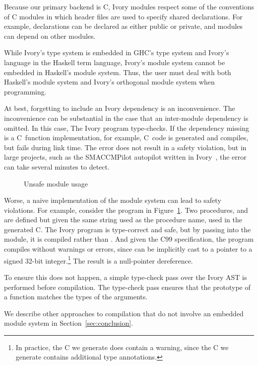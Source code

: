 Because our primary backend is C, Ivory modules respect some of the conventions
of C modules in which header files are used to specify shared declarations. For
example, declarations can be declared as either public or private, and modules
can depend on other modules.

While Ivory's type system is embedded in GHC's type system and Ivory's language
in the Haskell term language, Ivory's module system cannot be embedded in
Haskell's module system. Thus, the user must deal with both Haskell's module
system and Ivory's orthogonal module system when programming.

At best, forgetting to include an Ivory dependency is an inconvenience. The
inconvenience can be substantial in the case that an inter-module dependency is
omitted. In this case, The Ivory program type-checks. If the dependency missing
is a C~function implementation, for example, C~code is generated and compiles,
but fails during link time. The error does not result in a safety violation, but
in large projects, such as the SMACCMPilot autopilot written in Ivory~\cite{},
the error can take several minutes to detect.

\begin{figure}[h]
\caption{Unsafe module usage}
\label{fig:unsafe-module}
\end{figure}

Worse, a naive implementation of the module system can lead to safety
violations. For example, consider the program in
Figure~\ref{fig:unsafe-module}. Two procedures,  and 
are defined but given the same string used as the procedure name, used in the
generated C. The Ivory program is type-correct and safe, but by passing
 into the module, it is compiled rather than . And given
the C99 specification, the program compiles without warnings or errors, since
 can be implicitly cast to a pointer to a signed 32-bit
integer.\footnote{In practice, the C we generate does contain a warning, since
  the C we generate contains additional type annotations.} The result is a
null-pointer dereference.

To ensure this does not happen, a simple type-check pass over the Ivory AST is
performed before compilation. The type-check pass ensures that the prototype of
a function matches the types of the arguments.

We describe other approaches to compilation that do not involve an embedded
module system in Section~\ref{sec:conclusion}.







